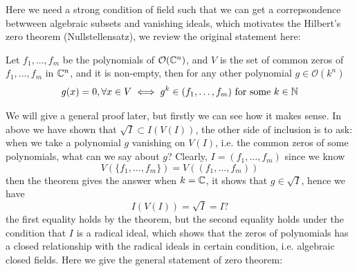 \documentclass[12pt,a4paper]{article}
\begin{document}
Here we need a strong condition of field such that we can get a correpsondence betwween algebraic subsets and vanishing ideals, which motivates the Hilbert's zero theorem (Nullstellensatz), we review the original statement here:
\begin{theorem}[1893]
    Let \(f_1,...,f_m\) be the polynomials of \(\mathcal{O}(\mathbb{C}^n)\), and \(V\) is the set of common zeros of \(f_1,...,f_m\) in \(\mathbb{C}^n\), and it is non-empty, then for any other polynomial \(g \in \mathcal{O}(k^n)\)
    \[g(x) = 0, \forall x \in V \iff g^k \in (f_1,\dots,f_m) \text{ for some } k \in \mathbb{N}\]
\end{theorem}
We will give a general proof later, but firstly we can see how it makes sense. In above we have shown that \(\sqrt{I} \subset I(V(I))\), the other side of inclusion is to ask: when we take a polynomial \(g\) vanishing on \(V(I)\), i.e. the common zeros of some polynomials, what can we say about \(g\)? Clearly, \(I = (f_1,\dots,f_m)\) since we know 
\[V(\{f_1,\dots,f_m\}) = V((f_1,\dots,f_m))\]
then the theorem gives the answer when \(k = \mathbb{C}\), it shows that \(g \in \sqrt{I}\), hence we have
\[I(V(I)) = \sqrt{I} = I ?\]
the first equality holds by the theorem, but the second equality holds under the condition that \(I\) is a radical ideal, which shows that the zeros of polynomials has a closed relationship with the radical ideals in certain condition, i.e. algebraic closed fields. Here we give the general statement of zero theorem:
\end{document}
